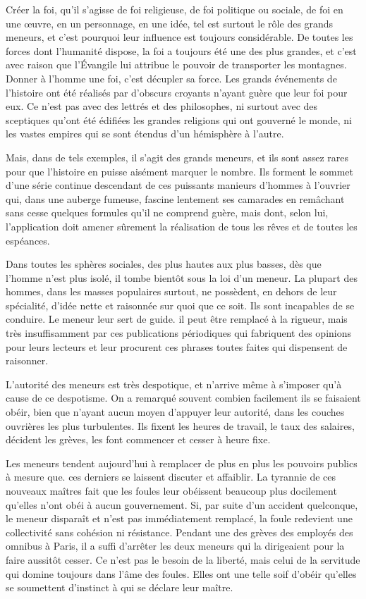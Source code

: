 \documentclass[french,twoside]{book} %
\begin{document}
Créer la foi, qu’il s’agisse de foi religieuse, de foi politique ou sociale, de foi en une œuvre, en un personnage, en une idée, tel est surtout le rôle des grands meneurs, et c’est pourquoi leur influence est toujours considérable. De toutes les forces dont l’humanité dispose, la foi a toujours été une des plus grandes, et c’est avec raison que l’Évangile lui attribue le pouvoir de transporter les montagnes. Donner à l’homme une foi, c’est décupler sa force. Les grands événements de l’histoire ont été réalisés par d’obscurs croyants n’ayant guère que leur foi pour eux. Ce n’est pas avec des lettrés et des philosophes, ni surtout avec des sceptiques qu’ont été édifiées les grandes religions qui ont gouverné le monde, ni les vastes empires qui se sont étendus d’un hémisphère à l’autre.\par
Mais, dans de tels exemples, il s’agit des grands meneurs, et ils sont assez rares pour que l’histoire en puisse aisément marquer le nombre. Ils forment le sommet d’une série continue descendant de ces puissants manieurs d’hommes à l’ouvrier qui, dans une auberge fumeuse, fascine lentement ses camarades en remâchant sans cesse quelques formules qu’il ne comprend guère, mais dont, selon lui, l’application doit amener sûrement la réalisation de tous les rêves et de toutes les espé­ances.\par
Dans toutes les sphères sociales, des plus hautes aux plus basses, dès que l’homme n’est plus isolé, il tombe bientôt sous la loi d’un meneur. La plupart des hommes, dans les masses populaires surtout, ne possèdent, en dehors de leur spécialité, d’idée nette et raisonnée sur quoi que ce soit. Ils sont incapables de se conduire. Le meneur leur sert de guide. il peut être remplacé à la rigueur, mais très insuffisamment par ces pu­blications périodiques qui fabriquent des opinions pour leurs lecteurs et leur procurent ces phrases toutes faites qui dispensent de raisonner.\par
L’autorité des meneurs est très despotique, et n’arrive même à s’imposer qu’à cause de ce despotisme. On a remarqué souvent combien facilement ils se faisaient obéir, bien que n’ayant aucun moyen d’appuyer leur autorité, dans les couches ouvrières les plus turbulentes. Ils fixent les heures de travail, le taux des salaires, décident les grèves, les font commencer et cesser à heure fixe.\par
Les meneurs tendent aujourd’hui à remplacer de plus en plus les pouvoirs publics à mesure que. ces derniers se laissent discuter et affaiblir. La tyrannie de ces nouveaux maîtres fait que les foules leur obéissent beaucoup plus docilement qu’elles n’ont obéi à aucun gouvernement. Si, par suite d’un accident quelconque, le meneur disparaît et n’est pas immédiatement remplacé, la foule redevient une collectivité sans cohésion ni résistance. Pendant une des grèves des employés des omnibus à Paris, il a suffi d’arrêter les deux meneurs qui la dirigeaient pour la faire aussitôt cesser. Ce n’est pas le besoin de la liberté, mais celui de la servitude qui domine toujours dans l’âme des foules. Elles ont une telle soif d’obéir qu’elles se soumettent d’instinct à qui se déclare leur maître.\par
\end{document}
